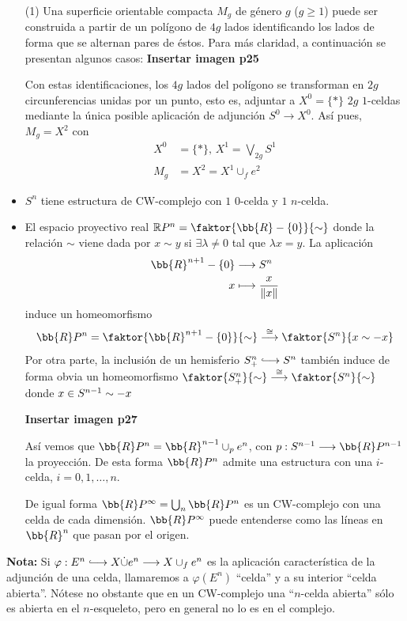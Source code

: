 \begin{ejems}
\begin{itemize}
\item[(1)] Una superficie orientable compacta $M_g$ de género $g$ ($ g \geq 1$) puede ser construida a partir de un polígono de $4g$ lados identificando los lados de forma que se alternan pares de éstos. Para más claridad, a continuación se presentan algunos casos:
\textbf{Insertar imagen p25} \par 
Con estas identificaciones, los $4g$ lados del polígono se transforman en $2g$ circunferencias unidas por un punto, esto es, adjuntar a $X^0 = \{ \ast \}$ $2g$ $1$-celdas mediante la única posible aplicación de adjunción $S^0 \longrightarrow X^0$. Así pues, $M_g = X^2$ con 
\begin{align*} 
X^0 &= \{ \ast \} \text{,  } X^1 = \bigvee_{2g} S^1 \\
M_g &= X^2 = X^1 \cup_f e^2
\end{align*}

\item $S^n$ tiene estructura de CW-complejo con $1$ $0$-celda y $1$ $n$-celda.
\item El espacio proyectivo real $\mathbb{R}P^n = \faktor{\bb{R}-\{0\}}{\sim}$ donde la relación $\sim$ viene dada por $x \sim y$ si $\exists \lambda \neq 0$ tal que $\lambda x = y$. La aplicación 
\begin{align*}
\bb{R}^{n+1} - \{0\} &\longrightarrow S^n \\
x &\longmapsto \frac{x}{\|x\|}
\end{align*}
induce un homeomorfismo
\[ \bb{R}P^n = \faktor{\bb{R}^{n+1} -\{0\}}{\sim} \stackrel{\cong}{\longrightarrow} \faktor{S^n}{x \sim -x} \]
Por otra parte, la inclusión de un hemisferio $S_+^n \longhookrightarrow S^n$ también induce de forma obvia un homeomorfismo $\faktor{S_+^n}{\sim} \stackrel{\cong}{\longrightarrow} \faktor{S^n}{\sim}$ donde $x \in S^{n-1} \sim \nobreak -x$ \par
\textbf{Insertar imagen p27} \par 
Así vemos que $\bb{R}P^n = \bb{R}^{n-1} \cup_p e^n$, con $p : S^{n-1} \longrightarrow \bb{R}P^{n-1}$ la proyección. De esta forma $\bb{R}P^n$ admite una estructura con una $i$-celda, $i = 0, 1, \ldots ,n$. \par 
De igual forma $\bb{R}P^\infty = \bigcup_n \bb{R}P^n$ es un CW-complejo con una celda de cada dimensión. $\bb{R}P^\infty$ puede entenderse como las líneas en $\bb{R}^n$ que pasan por el origen.
\end{itemize}
\textbf{Nota:} Si $\varphi : E^n \longhookrightarrow X \dot{\cup} e^n \longrightarrow X \cup_f e^n$ es la aplicación característica de la adjunción de una celda, llamaremos a $\varphi(E^n)$ ``celda'' y a su interior ``celda abierta''. Nótese no obstante que en un CW-complejo una ``$n$-celda abierta'' sólo es abierta en el $n$-esqueleto, pero en general no lo es en el complejo.
\end{ejems}

